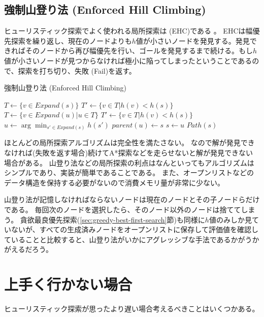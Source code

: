 \subsection{強制山登り法 (Enforced Hill Climbing)}

ヒューリスティック探索でよく使われる局所探索は (EHC)である \cite{hoffmann2005ignoring}。
EHCは幅優先探索を繰り返し、現在のノードよりも$h$値が小さいノードを発見する。発見できればそのノードから再び幅優先を行い、ゴールを発見するまで続ける。もし$h$値が小さいノードが見つからなければ極小に陥ってしまったということであるので、探索を打ち切り、失敗 (Fail)を返す。

\begin{algorithm}
\caption{強制山登り法 (Enforced Hill Climbing)}
	 {
	  $T \leftarrow \{v \in Expand(s)\}$\;
	  $T' \leftarrow \{v \in T | h(v) < h(s) \}$\;
           {
            $T \leftarrow \{v \in Expand(u) | u \in T\}$\;
 	    $T' \leftarrow \{v \in T | h(v) < h(s) \}$\;
          }
	  $u \leftarrow \arg \min_{s' \in Expand(s)} h(s')$\;
          $parent(u) \leftarrow s$\;
          $s \leftarrow u$\;
	}
	\Return $Path(s)$
\label{alg:enforced-hill-climbing}
\end{algorithm}


ほとんどの局所探索アルゴリズムは完全性を満たさない。
なので解が発見できなければ(失敗を返す場合)続けてA*探索などを走らせないと解が発見できない場合がある。
山登り法などの局所探索の利点はなんといってもアルゴリズムはシンプルであり、実装が簡単であることである。
また、オープンリストなどのデータ構造を保持する必要がないので消費メモリ量が非常に少ない。

山登り法が記憶しなければならないノードは現在のノードとその子ノードらだけである。
毎回次のノードを選択したら、そのノード以外のノードは捨ててしまう。
貪欲最良優先探索(\ref{sec:greedy-best-first-search}節)も同様に$h$値のみしか見ていないが、すべての生成済みノードをオープンリストに保存して評価値を確認していることと比較すると、山登り法がいかにアグレッシブな手法であるかがうかがえるだろう。

\section{上手く行かない場合}

ヒューリスティック探索が思ったより遅い場合考えるべきことはいくつかある。

